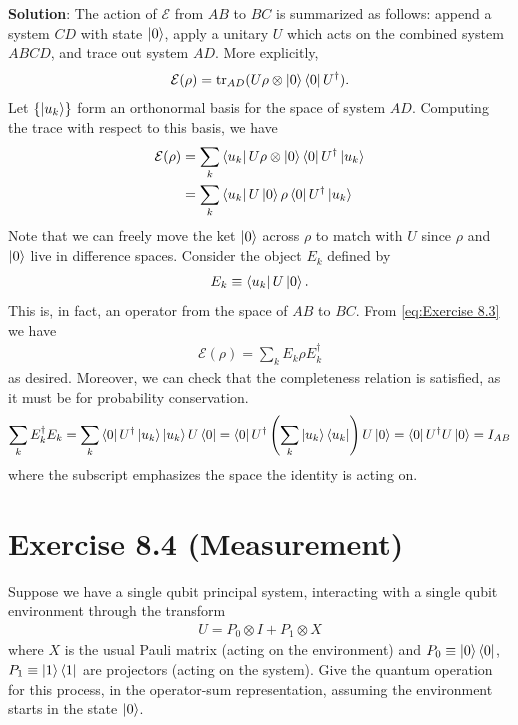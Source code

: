 \documentclass{book}
\newcommand{\mc}[1]{\mathcal{#1}}
\begin{document}
    \textbf{Solution}: The action of $\mc{E}$ from $AB$ to $BC$ is summarized as follows: append a system $CD$ with state $\ket{0}$, apply a unitary $U$ which acts on the combined system $ABCD$, and trace out system $AD$. More explicitly,
    \begin{align}
        \mc{E}(\rho) = \tr_{AD}(U \rho \otimes \ket{0}\bra{0} U^\dagger).
    \end{align}
    Let $\{\ket{u_k}\}$ form an orthonormal basis for the space of system $AD$. Computing the trace with respect to this basis, we have
    \begin{align} \label{eq:Exercise 8.3}
    \begin{aligned}
        \mc{E}(\rho) &= \sum_k \bra{u_k}U \rho \otimes \ket{0}\bra{0}U^\dagger \ket{u_k} \\
        &= \sum_k \bra{u_k}U\ket{0}\rho \bra{0}U^\dagger \ket{u_k}
    \end{aligned}
    \end{align}
    Note that we can freely move the ket $\ket{0}$ across $\rho$ to match with $U$ since $\rho$ and $\ket{0}$ live in difference spaces. Consider the object $E_k$ defined by
    \begin{align}
        E_k \equiv \bra{u_k}U\ket{0}.
    \end{align}
    This is, in fact, an operator from the space of $AB$ to $BC$. From \eqref{eq:Exercise 8.3} we have
    \begin{align}
        \mc{E}(\rho) = \sum_k E_k \rho E_k^\dagger
    \end{align}
    as desired. Moreover, we can check that the completeness relation is satisfied, as it must be for probability conservation.
    \begin{align}
        \sum_k E_k^\dagger E_k = \sum_k \bra{0}U^\dagger \ket{u_k}\ket{u_k}U\bra{0} = \bra{0}U^\dagger \left(\sum_k \ket{u_k}\bra{u_k}\right) U\ket{0} = \bra{0}U^\dagger U \ket{0} = I_{AB}
    \end{align}
    where the subscript emphasizes the space the identity is acting on. 
    
\section*{Exercise 8.4 (Measurement)}
    Suppose we have a single qubit principal system, interacting with a single qubit environment through the transform
    \begin{align}
        U = P_0\otimes I + P_1 \otimes X
    \end{align}
    where $X$ is the usual Pauli matrix (acting on the environment) and $P_0\equiv \ket{0}\bra{0}$, $P_1 \equiv \ket{1}\bra{1}$ are projectors (acting on the system). Give the quantum operation for this process, in the operator-sum representation, assuming the environment starts in the state $\ket{0}$.
    
\end{document}
